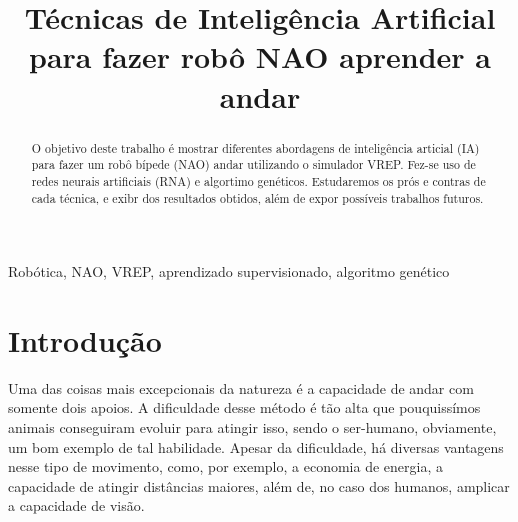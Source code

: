 \documentclass[twoside,conference,a4paper]{IEEEtran}
\begin{document}
\renewcommand{\IEEEkeywordsname}{Palavras-chave}


\title{Técnicas de Inteligência Artificial para fazer robô NAO aprender a andar}
\author{%
}


\maketitle

\begin{abstract}
O objetivo deste trabalho é mostrar diferentes abordagens de inteligência articial (IA) para fazer um robô bípede (NAO) andar utilizando o simulador VREP. Fez-se uso de redes neurais artificiais (RNA) e algortimo genéticos. Estudaremos os prós e contras de cada técnica, e exibr dos resultados obtidos, além de expor possíveis trabalhos futuros.
\end{abstract}

\begin{IEEEkeywords}
 Robótica, NAO, VREP, aprendizado supervisionado, algoritmo genético
\end{IEEEkeywords}


\section{Introdução}

Uma das coisas mais excepcionais da natureza é a capacidade de andar com somente dois apoios. A dificuldade desse método é tão alta que pouquissímos animais conseguiram evoluir para atingir isso, sendo o ser-humano, obviamente, um bom exemplo de tal habilidade. Apesar da dificuldade, há diversas vantagens nesse tipo de movimento, como, por exemplo, a economia de energia, a capacidade de atingir distâncias maiores, além de, no caso dos humanos, amplicar a capacidade de visão.
\end{document}
